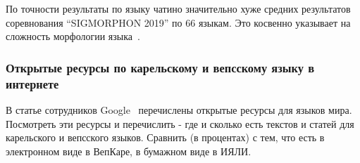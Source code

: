 




\bigskip
По точности результаты по языку чатино значительно хуже
средних результатов соревнования ``SIGMORPHON 2019'' по 66 языкам.
Это косвенно указывает на сложность морфологии языка~\cite[2822]{Cruz-Anastasopoulos-Stump2020Chatino}.


\subsubsection{Открытые ресурсы по карельскому и вепсскому языку в интернете} \label{sect_open_krl_vep_inet}

В статье сотрудников Google~\cite{Prasad2018} перечислены открытые ресурсы для языков мира.
Посмотреть эти ресурсы и перечислить - где и сколько есть текстов и статей
для карельского и вепсского языков. Сравнить (в процентах) с тем, что есть
в электронном виде в ВепКаре, в бумажном виде в ИЯЛИ.









